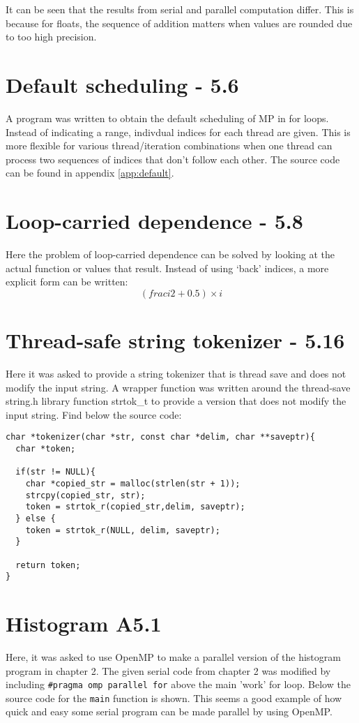 \documentclass[a4paper,11pt,twoside]{article}
\begin{document}
It can be seen that the results from serial and parallel computation differ. This is because for floats, the sequence of addition matters when values are rounded due to too high precision. 

\section{Default scheduling - 5.6}
A program was written to obtain the default scheduling of MP in for loops. Instead of indicating a range, indivdual indices for each thread are given. This is more flexible for various thread/iteration combinations when one thread can process two sequences of indices that don't follow each other. The source code can be found in appendix \ref{app:default}.  

\section{Loop-carried dependence - 5.8}
Here the problem of loop-carried dependence can be solved by looking at the actual function or values that result. Instead of using `back' indices, a more explicit form can be written:
\begin{equation}
(frac{i}{2} + 0.5)\times i  
\end{equation}

\section{Thread-safe string tokenizer - 5.16}
Here it was asked to provide a string tokenizer that is thread save and does not modify the input string.
A wrapper function was written around the thread-save string.h library function strtok\_t to provide a version that does not modify the input string. Find below the source code:
\begin{verbatim}
char *tokenizer(char *str, const char *delim, char **saveptr){
  char *token;

  if(str != NULL){
    char *copied_str = malloc(strlen(str + 1));
    strcpy(copied_str, str);
    token = strtok_r(copied_str,delim, saveptr);
  } else {
    token = strtok_r(NULL, delim, saveptr); 
  }

  return token; 
}
\end{verbatim}

\section{Histogram A5.1}
Here, it was asked to use OpenMP to make a parallel version of the histogram program in chapter 2. The given serial code from chapter 2 was modified by including \verb+#pragma omp parallel for+ above the main 'work' for loop. Below the source code for the \verb+main+ function is shown. This seems a good example of how quick and easy some serial program can be made parallel by using OpenMP.
\end{document}
